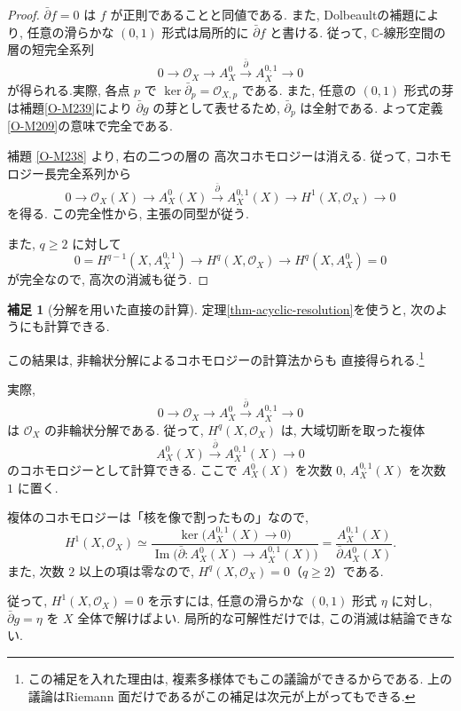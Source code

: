 \documentclass[dvipdfmx,a4paper,11pt]{article} %
\newcommand{\C}{\mathbb{C}}
\theoremstyle{definition}
\numberwithin{equation}{section}
\newtheorem{rem}[thm]{補足}
\begin{document}
\begin{proof}
$\bar\partial f=0$ は $f$ が正則であることと同値である.
また, Dolbeaultの補題により, 
任意の滑らかな $(0,1)$ 形式は局所的に $\bar\partial f$ と書ける.
従って, $\C$-線形空間の層の短完全系列
\[
0\longrightarrow\mathcal O_X
\longrightarrow A_X^0
\xrightarrow{\bar\partial}A_X^{0,1}
\longrightarrow0
\]
が得られる.実際, 各点 $p$ で $\ker\bar\partial_p=\mathcal O_{X,p}$ である. また, 任意の $(0,1)$ 形式の芽は補題\ref{O-M239}により $\bar\partial g$ の芽として表せるため, $\bar\partial_p$ は全射である. よって定義\ref{O-M209}の意味で完全である.


補題 \ref{O-M238} より, 右の二つの層の
高次コホモロジーは消える.
従って, コホモロジー長完全系列から
\[
0\longrightarrow\mathcal O_X(X)
\longrightarrow A_X^0(X)
\xrightarrow{\bar\partial}A_X^{0,1}(X)
\longrightarrow H^1(X,\mathcal O_X)
\longrightarrow0
\]
を得る.
この完全性から, 主張の同型が従う.

また, $q\geq2$ に対して
\[
0=H^{q-1}(X,A_X^{0,1})
\longrightarrow H^q(X,\mathcal O_X)
\longrightarrow H^q(X,A_X^0)=0
\]
が完全なので, 高次の消滅も従う.
\end{proof}
\begin{rem}[分解を用いた直接の計算]
定理\ref{thm-acyclic-resolution}を使うと, 次のようにも計算できる.

この結果は, 非輪状分解によるコホモロジーの計算法からも
直接得られる.\footnote{この補足を入れた理由は, 複素多様体でもこの議論ができるからである. 上の議論はRiemann 面だけであるがこの補足は次元が上がってもできる. }

実際, 
\[
0\longrightarrow\mathcal O_X
\longrightarrow A_X^0
\xrightarrow{\bar\partial}A_X^{0,1}
\longrightarrow0
\]
は $\mathcal O_X$ の非輪状分解である.
従って, $H^q(X,\mathcal O_X)$ は, 
大域切断を取った複体
\[
A_X^0(X)\xrightarrow{\bar\partial}A_X^{0,1}(X)
\longrightarrow0
\]
のコホモロジーとして計算できる.
ここで $A_X^0(X)$ を次数 $0$, 
$A_X^{0,1}(X)$ を次数 $1$ に置く.

複体のコホモロジーは「核を像で割ったもの」なので, 
\[
H^1(X,\mathcal O_X)
\simeq
\frac{\ker\bigl(A_X^{0,1}(X)\to0\bigr)}
{\operatorname{Im}\bigl(\bar\partial:A_X^0(X)\to A_X^{0,1}(X)\bigr)}
=
\frac{A_X^{0,1}(X)}{\bar\partial A_X^0(X)}.
\]
また, 次数 $2$ 以上の項は零なので, 
$H^q(X,\mathcal O_X)=0$（$q\geq2$）である.

\end{rem}


従って, $H^1(X,\mathcal O_X)=0$ を示すには, 
任意の滑らかな $(0,1)$ 形式 $\eta$ に対し, 
$\bar\partial g=\eta$ を $X$ 全体で解けばよい.
局所的な可解性だけでは, この消滅は結論できない.
\end{document}
